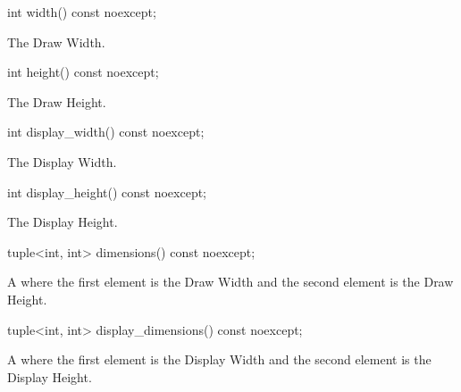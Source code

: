 \begin{itemdecl}
int width() const noexcept;
\end{itemdecl}
\begin{itemdescr}
\pnum
\returns
The Draw Width.
\end{itemdescr}

\begin{itemdecl}
int height() const noexcept;
\end{itemdecl}
\begin{itemdescr}
\pnum
\returns
The Draw Height.
\end{itemdescr}

\begin{itemdecl}
int display_width() const noexcept;
\end{itemdecl}
\begin{itemdescr}
\pnum
\returns
The Display Width.
\end{itemdescr}

\begin{itemdecl}
int display_height() const noexcept;
\end{itemdecl}
\begin{itemdescr}
\pnum
\returns
The Display Height.
\end{itemdescr}

\begin{itemdecl}
tuple<int, int> dimensions() const noexcept;
\end{itemdecl}
\begin{itemdescr}
\pnum
\returns
A  where the first element is the Draw Width and the second element is the Draw Height.
\end{itemdescr}

\begin{itemdecl}
tuple<int, int> display_dimensions() const noexcept;
\end{itemdecl}
\begin{itemdescr}
\pnum
\returns
A  where the first element is the Display Width and the second element is the Display Height.
\end{itemdescr}

